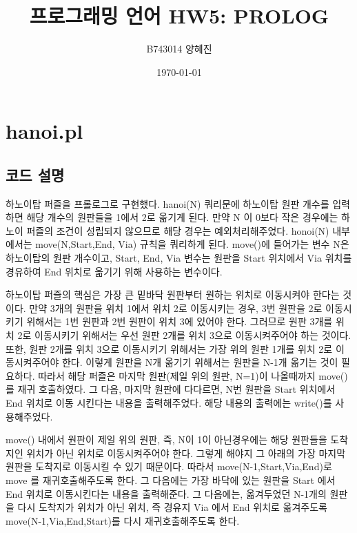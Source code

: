 \documentclass{article}
\begin{document}
\title{프로그래밍 언어 HW5: PROLOG}
\author{B743014 양혜진}
\date{\today}
\maketitle

\section{hanoi.pl}
\subsection{코드 설명}
하노이탑 퍼즐을 프롤로그로 구현했다. hanoi(N) 쿼리문에 하노이탑 원판 개수를 입력하면
해당 개수의 원판들을 1에서 2로 옮기게 된다. 만약 N 이 0보다 작은 경우에는 하노이 퍼즐의
조건이 성립되지 않으므로 해당 경우는 예외처리해주었다.
honoi(N) 내부에서는 move(N,Start,End, Via) 규칙을 쿼리하게 된다.
move()에 들어가는 변수 N은 하노이탑의 원판 개수이고, Start, End, Via 변수는
원판을 Start 위치에서 Via 위치를 경유하여 End 위치로 옮기기 위해 사용하는 변수이다.

\vspace{3mm}
\noindent 하노이탑 퍼즐의 핵심은 가장 큰 밑바닥 원판부터 원하는 위치로 이동시켜야 한다는 것이다.
만약 3개의 원판을 위치 1에서 위치 2로 이동시키는 경우, 3번 원판을 2로 이동시키기 위해서는
1번 원판과 2번 원판이 위치 3에 있어야 한다. 그러므로 원판 3개를 위치 2로 이동시키기 위해서는 우선
원판 2개를 위치 3으로 이동시켜주어야 하는 것이다. 또한, 원판 2개를 위치 3으로 이동시키기 위해서는
가장 위의 원판 1개를 위치 2로 이동시켜주어야 한다. 이렇게 원판을 N개 옮기기 위해서는
원판을 N-1개 옮기는 것이 필요하다. 따라서 해당 퍼즐은 마지막 원판(제일 위의 원판, N=1)이 나올때까지
move()를 재귀 호출하였다. 그 다음, 마지막 원판에 다다르면, N번 원판을 Start 위치에서 End 위치로
이동 시킨다는 내용을 출력해주었다. 해당 내용의 출력에는 write()를 사용해주었다.

\vspace{3mm}
\noindent move() 내에서 원판이 제일 위의 원판, 즉, N이 1이 아닌경우에는 해당 원판들을 도착지인 위치가 아닌
위치로 이동시켜주어야 한다. 그렇게 해야지 그 아래의 가장 마지막 원판을 도착지로 이동시킬 수 있기 때문이다.
따라서 move(N-1,Start,Via,End)로 move 를 재귀호출해주도록 한다.
그 다음에는 가장 바닥에 있는 원판을 Start 에서 End 위치로 이동시킨다는 내용을 출력해준다.
그 다음에는, 옮겨두었던 N-1개의 원판을 다시 도착지가 위치가 아닌 위치, 즉 경유지 Via 에서
End 위치로 옮겨주도록 move(N-1,Via,End,Start)를 다시 재귀호출해주도록 한다.
\end{document}
